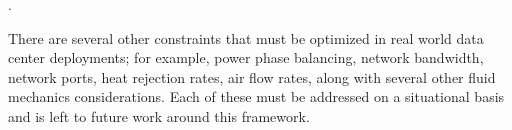     .
    
    There are several other constraints that must be optimized in real world data center deployments; for example, power phase balancing, network bandwidth, network ports, heat rejection rates, air flow rates, along with several other fluid mechanics considerations. Each of these must be addressed on a situational basis and is left to future work around this framework.
        
    
   
    

    
    
